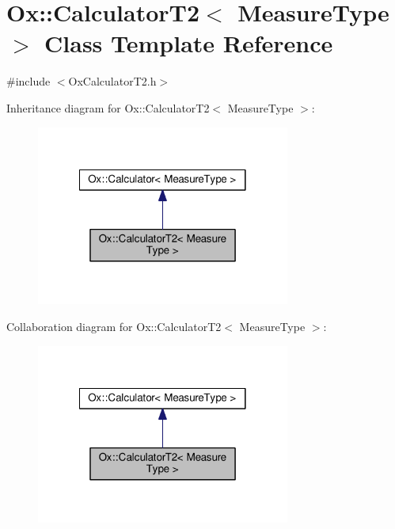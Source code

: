 \hypertarget{class_ox_1_1_calculator_t2}{\section{Ox\-:\-:Calculator\-T2$<$ Measure\-Type $>$ Class Template Reference}
\label{class_ox_1_1_calculator_t2}
}


{\ttfamily \#include $<$Ox\-Calculator\-T2.\-h$>$}



Inheritance diagram for Ox\-:\-:Calculator\-T2$<$ Measure\-Type $>$\-:
\nopagebreak
\begin{figure}[H]
\begin{center}
\leavevmode
\includegraphics[width=236pt]{class_ox_1_1_calculator_t2__inherit__graph}
\end{center}
\end{figure}


Collaboration diagram for Ox\-:\-:Calculator\-T2$<$ Measure\-Type $>$\-:
\nopagebreak
\begin{figure}[H]
\begin{center}
\leavevmode
\includegraphics[width=236pt]{class_ox_1_1_calculator_t2__coll__graph}
\end{center}
\end{figure}
